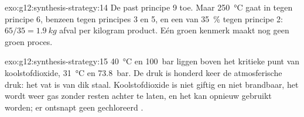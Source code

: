 \begin{solution}{exo:g12:synthesis-strategy:14}
De  past principe 9 toe. Maar \qty{250}{\celsius} gaat in
tegen principe 6, benzeen tegen principes 3 en 5, en een  van
\qty{35}{\percent} tegen principe 2: $65/35 = \qty{1.9}{kg}$ afval per
kilogram product. Eén groen kenmerk maakt nog geen groen proces.
\end{solution}

\begin{solution}{exo:g12:synthesis-strategy:15}
\qty{40}{\celsius} en \qty{100}{bar} liggen boven het kritieke punt van
koolstofdioxide, \qty{31}{\celsius} en \qty{73.8}{bar}. De druk is
honderd keer de atmosferische druk: het vat is van dik staal.
Koolstofdioxide is niet giftig en niet brandbaar, het wordt weer gas
zonder resten achter te laten, en het kan opnieuw gebruikt worden; er
ontsnapt geen gechloreerd .
\end{solution}

